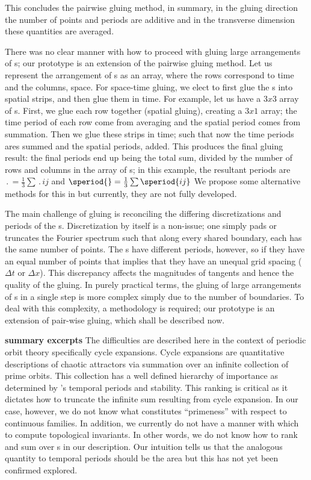 \begin{description}
{This concludes the pairwise gluing method, in summary, in the gluing direction the number of
points and periods are additive and in the transverse dimension these quantities are averaged.



There was no clear manner with how to proceed with gluing large arrangements of {\fpo}s;
our prototype is an extension of the pairwise gluing method.
Let us represent the arrangement of {\fpo}s as an array, where the rows correspond to time and
the columns, space. For space-time gluing,
we elect to first glue the {\fpo}s into spatial strips, and then glue them
in time. For example, let us have a $3x3$ array of {\fpo}s.
First, we glue each row together (spatial gluing), creating a $3x1$ array; the time period
of each row come from averaging and the spatial period comes from summation. Then we glue these strips
in time; such that now the time periods ares summed and the spatial periods, added.
This produces the final gluing result: the final periods end up being the total sum, divided
by the number of rows and columns in the array of {\fpo}s; in this example, the resultant periods are
$\period{} = \frac{1}{3} \sum \period{ij}$ and $\speriod{} = \frac{1}{3} \sum \speriod{ij}$
We propose some alternative methods for this in 
but currently, they are not fully developed.

The main challenge of gluing is reconciling the differing discretizations and periods
of the {\fpo}s. Discretization by itself is a non-issue; one simply pads or truncates the Fourier
spectrum such that along every shared boundary, each {\fpo} has the same number of points.
The {\fpo}s have different periods, however, so if they have an equal number of points that
implies that they have an unequal grid spacing ($\Delta t$ or $\Delta x$). This discrepancy
affects the magnitudes of tangents and hence the quality of the gluing. In purely
practical terms, the gluing of large arrangements of {\fpo}s in a single step is more
complex simply due to the number of boundaries. To deal with this complexity, a methodology
is required; our prototype is an extension of pair-wise gluing, which shall be described now.


\textbf{summary excerpts}
The difficulties are described here in the context of
periodic orbit theory specifically cycle expansions. Cycle
expansions are quantitative descriptions of
chaotic attractors via summation over
an infinite collection of prime orbits. This collection has a well defined
hierarchy of importance as determined by {\po}'s temporal periods and stability. This
ranking is critical as it dictates how to truncate the infinite sum resulting
from cycle expansion.
In our case, however, we do not know what constitutes ``primeness'' with respect to
continuous families. In addition, we currently do not have a manner with
which to compute {\spt} topological invariants. In other words, we do not know
how to rank and sum over {\po}s in our description.
Our intuition tells us that the analogous quantity to temporal periods should
be the {\spt} area but this has not yet been confirmed explored.
}


\end{description}
